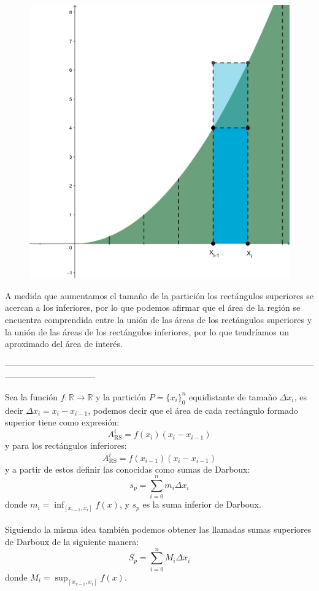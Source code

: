 \documentclass{article}
\begin{document}
\begin{figure}[h!]
	\centering
	\includegraphics[scale=2]{img/fig5.png}
\end{figure}

A medida que aumentamos el tamaño de la partición los rectángulos superiores se acercan a los inferiores, por lo que podemos afirmar que el área de la región se encuentra comprendida entre la unión de las áreas de los rectángulos superiores y la unión de las áreas de los rectángulos inferiores, por lo que tendríamos un aproximado del área de interés.
\begin{center}
	{\color{uprgreen}--------------------------------------------------------------------------------------------------------------------------------------------}
\end{center}
Sea la función $f:\mathbb{R}\rightarrow\mathbb{R}$ y la partición $P=\{x_i\}_0^n$ equidistante de tamaño $\Delta x_i$, es decir $\Delta x_i=x_i-x_{i-1}$, podemos decir que el área de cada rectángulo formado superior tiene como expresión:
$$A_{\text{RS}}^i=f(x_i)(x_i-x_{i-1})$$
y para los rectángulos inferiores:
$$A_{\text{RS}}^i=f(x_{i-1})(x_i-x_{i-1})$$
y a partir de estos definir las conocidas como sumas de Darboux:
$$s_p=\sum_{i=0}^nm_i\Delta x_i$$
donde $m_i=\inf_{[x_{i-1},x_i]}f(x)$, y $s_p$ es la {suma inferior de Darboux}.\\ \\
Siguiendo la misma idea también podemos obtener las llamadas sumas superiores de Darboux de la siguiente manera:
$$S_p=\sum_{i=0}^nM_i\Delta x_i$$
donde $M_i=\sup_{[x_{x-1},x_i]}f(x)$.
\end{document}
